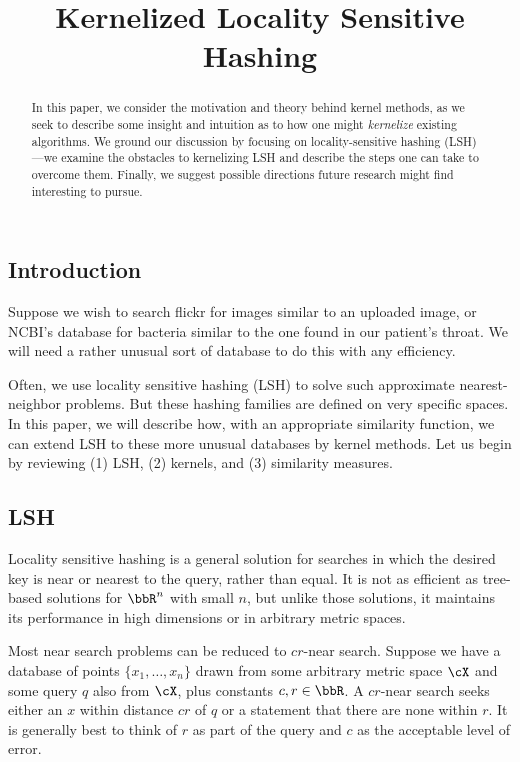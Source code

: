 \documentclass[twoside,11pt]{homework}
\title{Kernelized Locality Sensitive Hashing}
\begin{document}
\maketitle

\begin{abstract}
  In this paper, we consider the motivation and theory behind kernel
  methods, as we seek to describe some insight and intuition as to how
  one might \emph{kernelize} existing algorithms. We ground our discussion
  by focusing on locality-sensitive hashing (LSH)---we examine the
  obstacles to kernelizing LSH and describe the steps one can take to
  overcome them. Finally, we suggest possible directions future research
  might find interesting to pursue.
\end{abstract}

\begin{multicols}{2}

\section{Introduction}

Suppose we wish to search flickr for images similar to an uploaded image,
or NCBI's database for bacteria similar to the one found in our
patient's throat.  We will need a rather unusual sort of database to
do this with any efficiency.

Often, we use locality sensitive hashing (LSH) to solve such approximate
nearest-neighbor problems. But these hashing families are defined on very
specific spaces. In this paper, we will describe how, with an appropriate
similarity function, we can extend LSH to these more unusual databases by
kernel methods.  Let us begin by reviewing (1) LSH, (2) kernels, and (3)
similarity measures.

\subsection{LSH} %

Locality sensitive hashing is a general solution for searches in which
the desired key is near or nearest to the query, rather than equal.
It is not as efficient as tree-based solutions for $\bbR^n$ with small
$n$, but unlike those solutions, it maintains its performance in high
dimensions or in arbitrary metric spaces.

Most near search problems can be reduced to $cr$-near search.  Suppose
we have a database of points $\{x_1,\dotsc,x_n\}$ drawn from some
arbitrary metric space $\cX$ and some query $q$ also from $\cX$, plus
constants $c,r\in\bbR$.  A $cr$-near search seeks either an $x$ within
distance $cr$ of $q$ or a statement that there are none within $r$.
It is generally best to think of $r$ as part of the query and $c$ as
the acceptable level of error.


\end{multicols}
\end{document}
